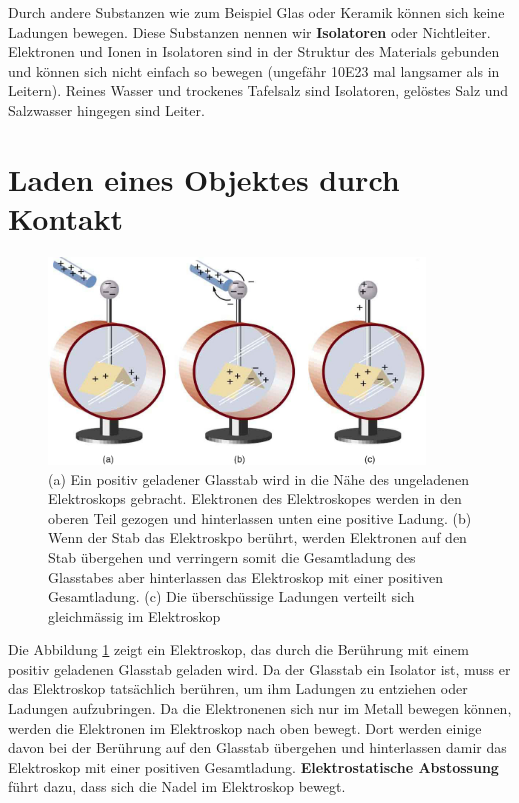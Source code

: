 \documentclass[11pt,twoside=false,open=any]{scrbook}
\begin{document}
Durch andere Substanzen wie zum Beispiel Glas oder Keramik können sich keine Ladungen bewegen. Diese Substanzen nennen wir \textbf{Isolatoren} oder Nichtleiter. Elektronen und Ionen in Isolatoren sind in der Struktur des Materials gebunden und können sich nicht einfach so bewegen (ungefähr \SI{10E23}{} mal langsamer als in Leitern). Reines Wasser und trockenes Tafelsalz sind Isolatoren, gelöstes Salz und Salzwasser hingegen sind Leiter. 

\section{Laden eines Objektes durch Kontakt}
\begin{figure}[h]
\centering
\includegraphics[width=10cm]{elektroskop1.jpg}
\caption{(a) Ein positiv geladener Glasstab wird in die Nähe des ungeladenen Elektroskops gebracht. Elektronen des Elektroskopes werden in den oberen Teil gezogen und hinterlassen unten eine positive Ladung. (b) Wenn der Stab das Elektroskpo berührt, werden Elektronen auf den Stab übergehen und verringern somit die Gesamtladung des Glasstabes aber hinterlassen das Elektroskop mit einer positiven Gesamtladung. (c) Die überschüssige Ladungen verteilt sich gleichmässig im Elektroskop}
\label{fig:elektroskop1}
\end{figure}

Die Abbildung \ref{fig:elektroskop1} zeigt ein Elektroskop, das durch die Berührung mit einem positiv geladenen Glasstab geladen wird. Da der Glasstab ein Isolator ist, muss er das Elektroskop tatsächlich berühren, um ihm Ladungen zu entziehen oder Ladungen aufzubringen. Da die Elektronenen sich nur im Metall bewegen können, werden die Elektronen im Elektroskop nach oben bewegt. Dort werden einige davon bei der Berührung auf den Glasstab übergehen und hinterlassen damir das Elektroskop mit einer positiven Gesamtladung. \textbf{Elektrostatische Abstossung} führt dazu, dass sich die Nadel im Elektroskop bewegt. 
\end{document}
